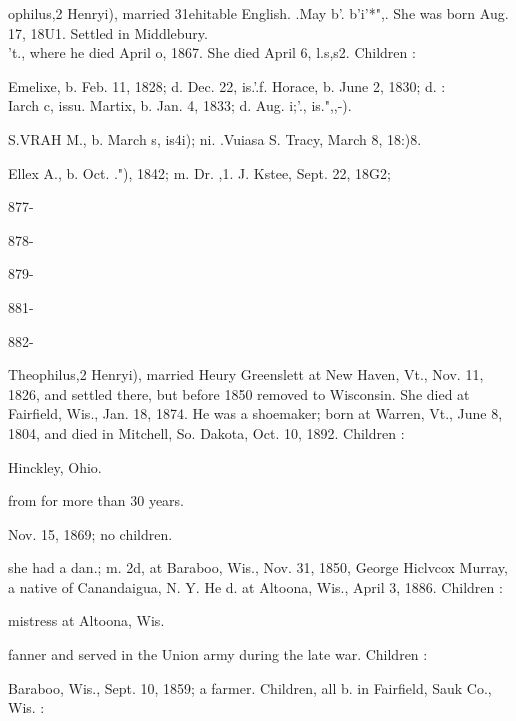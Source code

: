 \documentclass[oneside]{book}
\begin{document}
ophilus,2 Henryi), married 31ehitable English. .May b'. b'i'*",. 
She was born Aug. 17, 18U1. Settled in Middlebury. \\'t., where 
he died April o, 1867. She died April 6, l.s,s2. Children : 

Emelixe, b. Feb. 11, 1828; d. Dec. 22, is.'.f. 
Horace, b. June 2, 1830; d. :\\Iarch c, issu. 
Martix, b. Jan. 4, 1833; d. Aug. i;'., is.",,-). 

S.VRAH M., b. March s, is4i); ni. .Vuiasa S. Tracy, March 8, 
18:)8. 

Ellex A., b. Oct. ."), 1842; m. Dr. ,1. J. Kstee, Sept. 22, 18G2; 



877- 




878- 




879- 






881- 




882- 






Theophilus,2 Henryi), married Heury Greenslett at New Haven, 
Vt., Nov. 11, 1826, and settled there, but before 1850 removed 
to Wisconsin. She died at Fairfield, Wis., Jan. 18, 1874. He 
was a shoemaker; born at Warren, Vt., June 8, 1804, and died 
in Mitchell, So. Dakota, Oct. 10, 1892. Children : 


Hinckley, Ohio. 



from for more than 30 years. 






Nov. 15, 1869; no children. 


she had a dan.; m. 2d, at Baraboo, Wis., Nov. 31, 1850, 
George Hiclvcox Murray, a native of Canandaigua, N. Y. He 
d. at Altoona, Wis., April 3, 1886. Children : 








mistress at Altoona, Wis. 


fanner and served in the Union army during the late war. 
Children : 





Baraboo, Wis., Sept. 10, 1859; a farmer. Children, all b. in 
Fairfield, Sauk Co., Wis. : 
\end{document}

